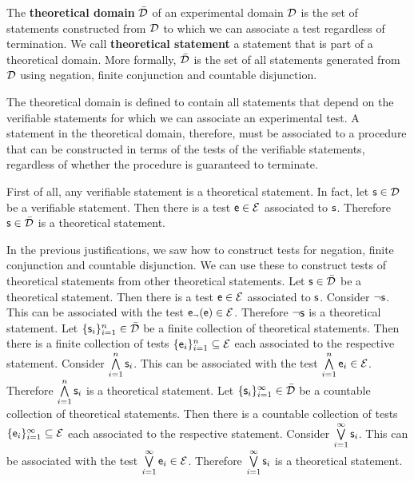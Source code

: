 \documentclass[11pt,letterpaper,fleqn]{memoir} %
\begin{document}
\begin{mathSection}
\begin{defn}\label{1_def_theoretical_domain}
	The \textbf{theoretical domain} $\bar{\mathcal{D}}$ of an experimental domain $\mathcal{D}$ is the set of statements constructed from $\mathcal{D}$ to which we can associate a test regardless of termination. We call \textbf{theoretical statement} a statement that is part of a theoretical domain. More formally, $\bar{\mathcal{D}}$ is the set of all statements generated from $\mathcal{D}$ using negation, finite conjunction and countable disjunction.
\end{defn}
\begin{justification}
	The theoretical domain is defined to contain all statements that depend on the verifiable statements for which we can associate an experimental test. A statement in the theoretical domain, therefore, must be associated to a procedure that can be constructed in terms of the tests of the verifiable statements, regardless of whether the procedure is guaranteed to terminate.
	
	First of all, any verifiable statement is a theoretical statement. In fact, let $\mathsf{s} \in \mathcal{D}$ be a verifiable statement. Then there is a test $\mathsf{e} \in \mathcal{E}$ associated to $\mathsf{s}$. Therefore $\mathsf{s} \in \bar{\mathcal{D}}$ is a theoretical statement.
	
	In the previous justifications, we saw how to construct tests for negation, finite conjunction and countable disjunction. We can use these to construct tests of theoretical statements from other theoretical statements. Let $\mathsf{s} \in \bar{\mathcal{D}}$ be a theoretical statement. Then there is a test $\mathsf{e} \in \mathcal{E}$ associated to $\mathsf{s}$. Consider $\neg\mathsf{s}$. This can be associated with the test $\mathsf{e}_\neg(\mathsf{e}) \in \mathcal{E}$. Therefore $\neg\mathsf{s}$ is a theoretical statement. Let $\{\mathsf{s}_i\}_{i=1}^{n} \in \bar{\mathcal{D}}$ be a finite collection of theoretical statements. Then there is a finite collection of tests $\{\mathsf{e}_i\}_{i=1}^{n} \subseteq \mathcal{E}$ each associated to the respective statement. Consider $\bigwedge\limits_{i=1}^{n} \mathsf{s}_i$. This can be associated with the test $\bigwedge\limits_{i=1}^{n} \mathsf{e}_i \in \mathcal{E}$. Therefore $\bigwedge\limits_{i=1}^{n} \mathsf{s}_i$ is a theoretical statement. Let $\{\mathsf{s}_i\}_{i=1}^{\infty} \in \bar{\mathcal{D}}$ be a countable collection of theoretical statements. Then there is a countable collection of tests $\{\mathsf{e}_i\}_{i=1}^{\infty} \subseteq \mathcal{E}$ each associated to the respective statement. Consider $\bigvee\limits_{i=1}^{\infty} \mathsf{s}_i$. This can be associated with the test $\bigvee\limits_{i=1}^{\infty} \mathsf{e}_i \in \mathcal{E}$. Therefore $\bigvee\limits_{i=1}^{\infty} \mathsf{s}_i$ is a theoretical statement.
	

\end{justification}
\end{mathSection}
\end{document}
